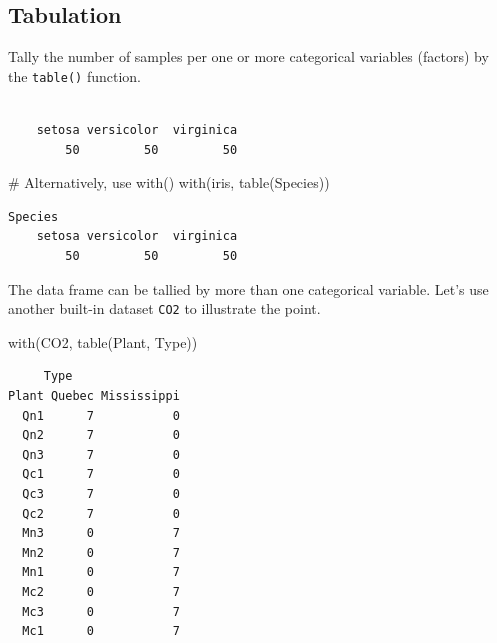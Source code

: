 \documentclass[
  letterpaper,
  DIV=11,
  numbers=noendperiod]{scrreprt}
\newenvironment{Shaded}{\begin{snugshade}}{\end{snugshade}}
\newcommand{\CommentTok}[1]{\textcolor[rgb]{0.37,0.37,0.37}{#1}}
\newcommand{\FunctionTok}[1]{\textcolor[rgb]{0.28,0.35,0.67}{#1}}
\newcommand{\NormalTok}[1]{\textcolor[rgb]{0.00,0.23,0.31}{#1}}
\newcommand{\SpecialCharTok}[1]{\textcolor[rgb]{0.37,0.37,0.37}{#1}}
\begin{document}
\subsection{Tabulation}\label{sec-base-tabulation}

Tally the number of samples per one or more categorical variables
(factors) by the \texttt{table()} function.

\begin{Shaded}
\end{Shaded}

\begin{verbatim}

    setosa versicolor  virginica 
        50         50         50 
\end{verbatim}

\begin{Shaded}
\begin{Highlighting}[]
\CommentTok{\# Alternatively, use with()}
\FunctionTok{with}\NormalTok{(iris, }\FunctionTok{table}\NormalTok{(Species))}
\end{Highlighting}
\end{Shaded}

\begin{verbatim}
Species
    setosa versicolor  virginica 
        50         50         50 
\end{verbatim}

The data frame can be tallied by more than one categorical variable.
Let's use another built-in dataset \texttt{CO2} to illustrate the point.

\begin{Shaded}
\begin{Highlighting}[]
\FunctionTok{with}\NormalTok{(CO2, }\FunctionTok{table}\NormalTok{(Plant, Type))}
\end{Highlighting}
\end{Shaded}

\begin{verbatim}
     Type
Plant Quebec Mississippi
  Qn1      7           0
  Qn2      7           0
  Qn3      7           0
  Qc1      7           0
  Qc3      7           0
  Qc2      7           0
  Mn3      0           7
  Mn2      0           7
  Mn1      0           7
  Mc2      0           7
  Mc3      0           7
  Mc1      0           7
\end{verbatim}
\end{document}
